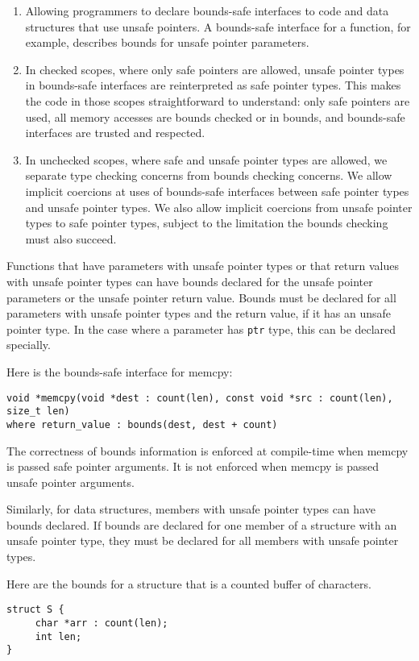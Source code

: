 \begin{enumerate}
\item
  Allowing programmers to declare bounds-safe interfaces to code and
  data structures that use unsafe pointers. A bounds-safe interface for
  a function, for example, describes bounds for unsafe pointer
  parameters.
\item
  In checked scopes, where only safe pointers are allowed, unsafe
  pointer types in bounds-safe interfaces are reinterpreted as safe
  pointer types. This makes the code in those scopes straightforward to
  understand: only safe pointers are used, all memory accesses are
  bounds checked or in bounds, and bounds-safe interfaces are trusted
  and respected.
\item
  In unchecked scopes, where safe and unsafe pointer types are allowed,
  we separate type checking concerns from bounds checking concerns. We
  allow implicit coercions at uses of bounds-safe interfaces between
  safe pointer types and unsafe pointer types. We also allow implicit
  coercions from unsafe pointer types to safe pointer types, subject to
  the limitation the bounds checking must also succeed.
\end{enumerate}

Functions that have parameters with unsafe pointer types or that return
values with unsafe pointer types can have bounds declared for the unsafe
pointer parameters or the unsafe pointer return value. Bounds must be
declared for all parameters with unsafe pointer types and the return
value, if it has an unsafe pointer type. In the case where a parameter
has \texttt{ptr} type, this can be declared specially.

Here is the bounds-safe interface for memcpy:
\begin{verbatim}
void *memcpy(void *dest : count(len), const void *src : count(len), size_t len)
where return_value : bounds(dest, dest + count)
\end{verbatim}

The correctness of bounds information is enforced at compile-time when
memcpy is passed safe pointer arguments. It is not enforced when memcpy
is passed unsafe pointer arguments.

Similarly, for data structures, members with unsafe pointer types can
have bounds declared. If bounds are declared for one member of a
structure with an unsafe pointer type, they must be declared for all
members with unsafe pointer types.

Here are the bounds for a structure that is a counted buffer of
characters.
\begin{verbatim}
struct S {
     char *arr : count(len);
     int len;
}
\end{verbatim}

